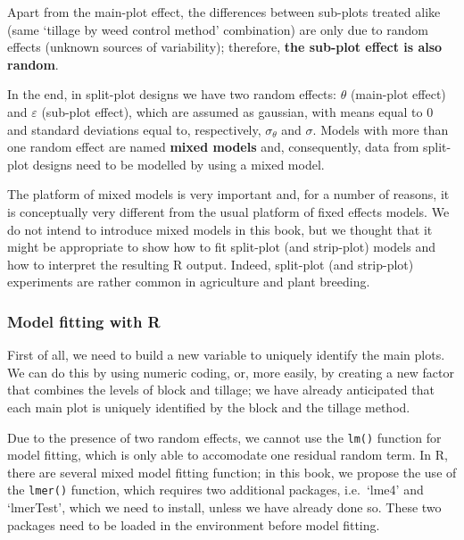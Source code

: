 \documentclass[a4paper,12pt,oneside]{book}
\newenvironment{Shaded}{\begin{snugshade}}{\end{snugshade}}
\newcommand{\SpecialCharTok}[1]{#1}
\newcommand{\OtherTok}[1]{#1}
\newcommand{\FunctionTok}[1]{#1}
\newcommand{\NormalTok}[1]{#1}
\begin{document}
Apart from the main-plot effect, the differences between sub-plots treated alike (same `tillage by weed control method' combination) are only due to random effects (unknown sources of variability); therefore, \textbf{the sub-plot effect is also random}.

In the end, in split-plot designs we have two random effects: \(\theta\) (main-plot effect) and \(\varepsilon\) (sub-plot effect), which are assumed as gaussian, with means equal to 0 and standard deviations equal to, respectively, \(\sigma_{\theta}\) and \(\sigma\). Models with more than one random effect are named \textbf{mixed models} and, consequently, data from split-plot designs need to be modelled by using a mixed model.

The platform of mixed models is very important and, for a number of reasons, it is conceptually very different from the usual platform of fixed effects models. We do not intend to introduce mixed models in this book, but we thought that it might be appropriate to show how to fit split-plot (and strip-plot) models and how to interpret the resulting R output. Indeed, split-plot (and strip-plot) experiments are rather common in agriculture and plant breeding.

\hypertarget{model-fitting-with-r-2}{%
\subsubsection{Model fitting with R}\label{model-fitting-with-r-2}}

First of all, we need to build a new variable to uniquely identify the main plots. We can do this by using numeric coding, or, more easily, by creating a new factor that combines the levels of block and tillage; we have already anticipated that each main plot is uniquely identified by the block and the tillage method.

\begin{Shaded}
\end{Shaded}

Due to the presence of two random effects, we cannot use the \texttt{lm()} function for model fitting, which is only able to accomodate one residual random term. In R, there are several mixed model fitting function; in this book, we propose the use of the \texttt{lmer()} function, which requires two additional packages, i.e.~`lme4' and `lmerTest', which we need to install, unless we have already done so. These two packages need to be loaded in the environment before model fitting.
\end{document}
